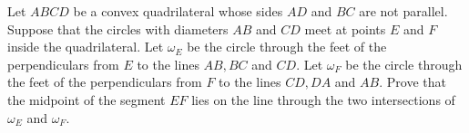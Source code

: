 Let $ABCD$ be a convex quadrilateral whose sides $AD$ and $BC$ are not parallel. Suppose that the circles with diameters $AB$ and $CD$ meet at points $E$ and $F$ inside the quadrilateral. Let $\omega_E$ be the circle through the feet of the perpendiculars from $E$ to the lines $AB,BC$ and $CD$. Let $\omega_F$ be the circle through  the feet of the perpendiculars from $F$ to the lines $CD,DA$ and $AB$. Prove that the midpoint of the segment $EF$ lies on the line through the two intersections of $\omega_E$ and $\omega_F$.